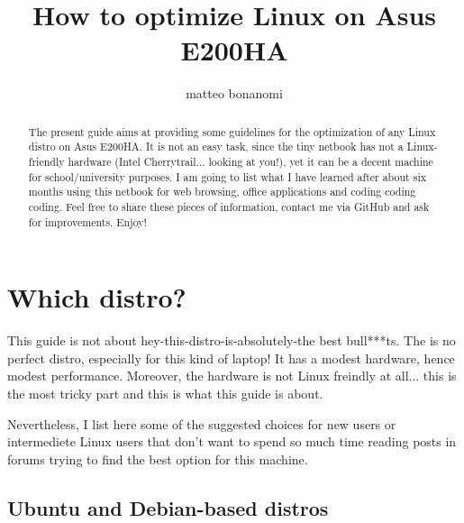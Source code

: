 \documentclass{article}
\begin{document}
\title{How to optimize Linux on Asus E200HA}
\author{matteo bonanomi}

\maketitle

\begin{abstract}
The present guide aims at providing some guidelines for the optimization of any Linux distro on Asus E200HA. It is not an easy task, since the tiny netbook has not a Linux-friendly hardware (Intel Cherrytrail... looking at you!), yet it can be a decent machine for school/university purposes. I am going to list what I have learned after about six months using this netbook for web browsing, office applications and coding coding coding. Feel free to share these pieces of information, contact me via GitHub and ask for improvements. Enjoy!
\end{abstract}

\section{Which distro?}
This guide is not about hey-this-distro-is-absolutely-the best bull***ts. The is no perfect distro, especially for this kind of laptop! It has a modest hardware, hence modest performance. Moreover, the hardware is not Linux freindly at all... this is the most tricky part and this is what this guide is about. 

Nevertheless, I list here some of the suggested choices for new users or intermediete Linux users that don't want to spend so much time reading posts in forums trying to find the best option for this machine. 

\subsection{Ubuntu and Debian-based distros}
\end{document}
